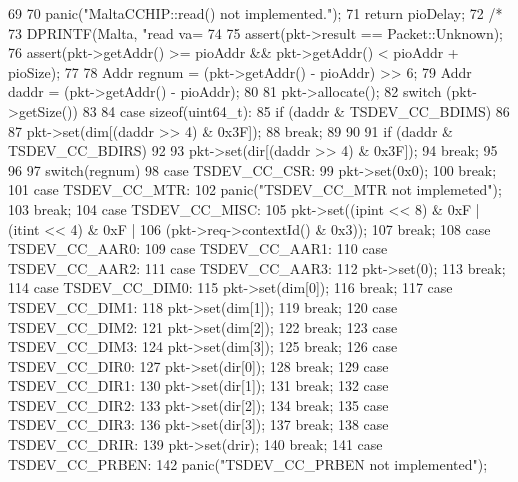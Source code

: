 \begin{DoxyCode}
69 {
70                 panic("MaltaCCHIP::read() not implemented.");
71                 return pioDelay;
72                 /*
73     DPRINTF(Malta, "read  va=%
74 
75     assert(pkt->result == Packet::Unknown);
76     assert(pkt->getAddr() >= pioAddr && pkt->getAddr() < pioAddr + pioSize);
77 
78     Addr regnum = (pkt->getAddr() - pioAddr) >> 6;
79     Addr daddr = (pkt->getAddr() - pioAddr);
80 
81     pkt->allocate();
82     switch (pkt->getSize()) {
83 
84       case sizeof(uint64_t):
85           if (daddr & TSDEV_CC_BDIMS)
86           {
87               pkt->set(dim[(daddr >> 4) & 0x3F]);
88               break;
89           }
90 
91           if (daddr & TSDEV_CC_BDIRS)
92           {
93               pkt->set(dir[(daddr >> 4) & 0x3F]);
94               break;
95           }
96 
97           switch(regnum) {
98               case TSDEV_CC_CSR:
99                   pkt->set(0x0);
100                   break;
101               case TSDEV_CC_MTR:
102                   panic("TSDEV_CC_MTR not implemeted\n");
103                    break;
104               case TSDEV_CC_MISC:
105                   pkt->set((ipint << 8) & 0xF | (itint << 4) & 0xF |
106                                      (pkt->req->contextId() & 0x3));
107                   break;
108               case TSDEV_CC_AAR0:
109               case TSDEV_CC_AAR1:
110               case TSDEV_CC_AAR2:
111               case TSDEV_CC_AAR3:
112                   pkt->set(0);
113                   break;
114               case TSDEV_CC_DIM0:
115                   pkt->set(dim[0]);
116                   break;
117               case TSDEV_CC_DIM1:
118                   pkt->set(dim[1]);
119                   break;
120               case TSDEV_CC_DIM2:
121                   pkt->set(dim[2]);
122                   break;
123               case TSDEV_CC_DIM3:
124                   pkt->set(dim[3]);
125                   break;
126               case TSDEV_CC_DIR0:
127                   pkt->set(dir[0]);
128                   break;
129               case TSDEV_CC_DIR1:
130                   pkt->set(dir[1]);
131                   break;
132               case TSDEV_CC_DIR2:
133                   pkt->set(dir[2]);
134                   break;
135               case TSDEV_CC_DIR3:
136                   pkt->set(dir[3]);
137                   break;
138               case TSDEV_CC_DRIR:
139                   pkt->set(drir);
140                   break;
141               case TSDEV_CC_PRBEN:
142                   panic("TSDEV_CC_PRBEN not implemented\n");
}}}
\end{DoxyCode}
